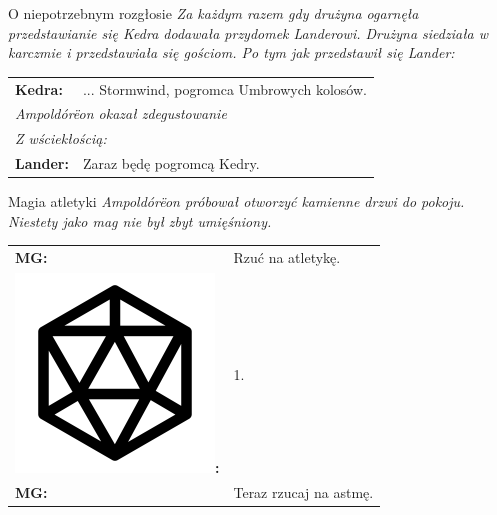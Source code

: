 \documentclass[10pt,twoside,twocolumn]{book}
\begin{document}
\begin{rpg-quotebox}{O niepotrzebnym rozgłosie}
   \textit{Za każdym razem gdy drużyna ogarnęła przedstawianie się Kedra dodawała przydomek Landerowi. Drużyna siedziała w karczmie i przedstawiała się gościom. Po tym jak przedstawił się Lander:}\\

   \begin{tabularx}{\columnwidth}{lX}
      \textbf{Kedra:} & ... Stormwind, pogromca Umbrowych kolosów.\\
      \multicolumn{2}{l}{\textit{Ampoldórëon okazał zdegustowanie}}\\
      \multicolumn{2}{l}{\textit{Z wściekłością:}}\\
      \textbf{Lander:} & Zaraz będę pogromcą Kedry.\\
   \end{tabularx}
\end{rpg-quotebox}


\begin{rpg-quotebox}{Magia atletyki}
   \textit{Ampoldórëon próbował otworzyć kamienne drzwi do pokoju. Niestety jako mag nie był zbyt umięśniony.}\\

   \begin{tabularx}{\columnwidth}{lX}
      \textbf{MG:} & Rzuć na atletykę.\\
      \includegraphics[scale=0.055]{img/d20.png}\textbf{:}& 1.\\
      \textbf{MG:} & Teraz rzucaj na astmę.\\
   \end{tabularx}
\end{rpg-quotebox}
\end{document}
